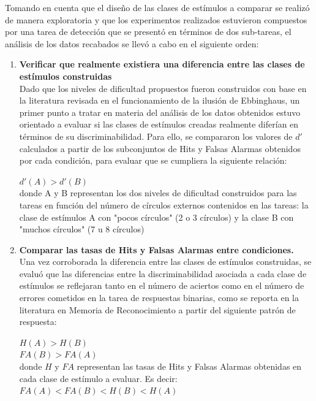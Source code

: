 Tomando en cuenta que el diseño de las clases de estímulos a comparar se realizó de manera exploratoria y que los experimentos realizados estuvieron compuestos por una tarea de detección que se presentó en términos de dos sub-tareas, el análisis de los datos recabados se llevó a cabo en el siguiente orden:\\

\begin{enumerate}
\item \textbf{Verificar que realmente existiera una diferencia entre las clases de estímulos construidas}\\

Dado que los niveles de dificultad propuestos fueron construidos con base en la literatura revisada en el funcionamiento de la ilusión de Ebbinghaus, un primer punto a tratar en materia del análisis de los datos obtenidos estuvo orientado a evaluar si las clases de estímulos creadas realmente diferían en términos de su discriminabilidad. Para ello, se compararon los valores de $d'$ calculados a partir de los subconjuntos de Hits y Falsas Alarmas obtenidos por cada condición, para evaluar que se cumpliera la siguiente relación:\\

\begin{center}
 $d'(A) > d'(B)$\\
 donde A y B representan los dos niveles de dificultad construidos para las tareas en función del número de círculos externos contenidos en las tareas: la clase de estímulos A con "pocos círculos" (2 o 3 círculos) y la clase B con "muchos círculos" (7 u 8 círculos)\\
\end{center}

\item \textbf{Comparar las tasas de Hits y Falsas Alarmas entre condiciones.}\\

Una vez corroborada la diferencia entre las clases de estímulos construidas, se evaluó que las diferencias entre la discriminabilidad asociada a cada clase de estímulos se reflejaran tanto en el número de aciertos como en el número de errores cometidos en la tarea de respuestas binarias, como se reporta en la literatura en Memoria de Reconocimiento a partir del siguiente patrón de respuesta:\\

\begin{center}
$H(A) > H(B)$\\
$FA(B) > FA(A)$\\
donde $H$ y $FA$ representan las tasas de Hits y Falsas Alarmas obtenidas en cada clase de estímulo a evaluar. Es decir:\\
$FA(A) < FA(B) < H(B) < H(A)$\\
\end{center}


\end{enumerate}

